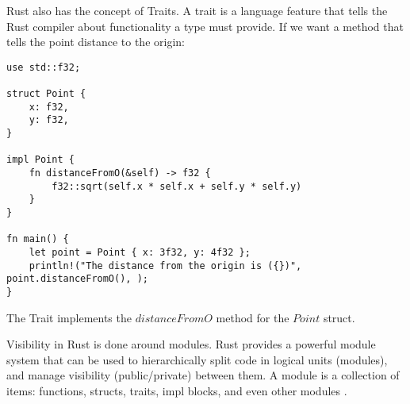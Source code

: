 Rust also has the concept of Traits. A trait is a language feature that tells
the Rust compiler about functionality a type must provide. If we want a method
that tells the point distance to the origin:

\begin{lstlisting}[label=rtrait,caption=Rust traits]
use std::f32;

struct Point {
    x: f32,
    y: f32,
}

impl Point {
    fn distanceFromO(&self) -> f32 {
        f32::sqrt(self.x * self.x + self.y * self.y)
    }
}

fn main() {
    let point = Point { x: 3f32, y: 4f32 }; 
    println!("The distance from the origin is ({})", point.distanceFromO(), );
}
\end{lstlisting}

The Trait implements the $distanceFromO$ method for the $Point$ struct.

Visibility in Rust is done around modules. Rust provides a powerful module 
system that can be used to hierarchically split code in logical units (modules),
and manage visibility (public/private) between them. A module is a collection of
items: functions, structs, traits, impl blocks, and even other modules \cite{7_14}.